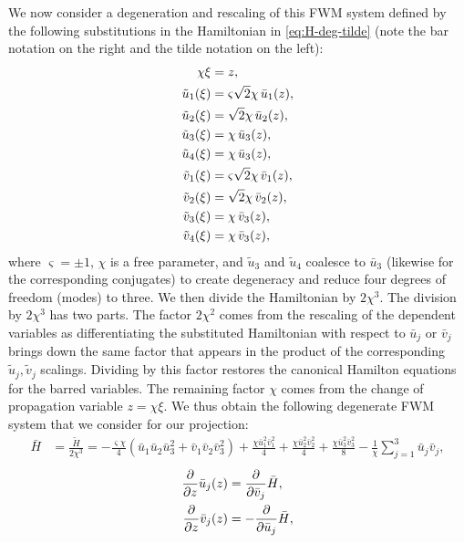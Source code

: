 \documentclass[11pt,a4paper]{article}
\numberwithin{equation}{section}
\begin{document}
We now consider a degeneration and rescaling of this FWM system defined by the following substitutions in the Hamiltonian in \eqref{eq:H-deg-tilde} (note the bar notation on the right and the tilde notation on the left):
\begin{align}
  \chi\xi &= z, \notag \\
  \tilde{u}_1(\xi) &= \varsigma \sqrt{2}\chi \,\bar{u}_1(z), \notag \\
  \tilde{u}_2(\xi) &= \sqrt{2} \chi  \,\bar{u}_2(z), \notag \\
  \tilde{u}_3(\xi) &= \chi  \,\bar{u}_3(z), \notag \\
  \tilde{u}_4(\xi) &= \chi  \,\bar{u}_3(z), \notag \\
  \tilde{v}_1(\xi) &= \varsigma \sqrt{2} \chi  \,\bar{v}_1(z), \notag \\
  \tilde{v}_2(\xi) &= \sqrt{2} \chi  \,\bar{v}_2(z), \notag \\
  \tilde{v}_3(\xi) &= \chi  \,\bar{v}_3(z), \notag \\
  \tilde{v}_4(\xi) &= \chi  \,\bar{v}_3(z), \notag \\
\end{align}
where $\varsigma = \pm 1$, $\chi$ is a free parameter, and $\tilde{u}_3$ and $\tilde{u}_4$ coalesce to $\bar{u}_3$ (likewise for the corresponding conjugates) to create degeneracy and reduce four degrees of freedom (modes) to three.
We then divide the Hamiltonian by $2 \chi^3$.
The division by $2\chi^3$ has two parts. The factor $2\chi^2$ comes from the rescaling of the dependent variables as differentiating the substituted Hamiltonian with respect to $\bar u_j$ or $\bar v_j$ brings down the same factor that appears in the product of the corresponding $\tilde u_j,\tilde v_j$ scalings. 
Dividing by this factor restores the canonical Hamilton equations for the barred variables. The remaining factor $\chi$ comes from the change of propagation variable $z=\chi\xi$.
We thus obtain the following degenerate FWM system that we consider for our projection:
\begin{align}
\bar{H} &= \frac{\tilde{H}}{2 \chi^{3}} = - \frac{\varsigma \chi }{4}\left( \bar{u}_1 \bar{u}_2 \bar{u}^{2}_3 + \bar{v}_1 \bar{v}_2 \bar{v}^{2}_3 \right) + \frac{\chi \bar{u}^{2}_1 \bar{v}^{2}_1}{4} + \frac{\chi \bar{u}^{2}_2 \bar{v}^{2}_2}{4} + \frac{\chi \bar{u}^{2}_3 \bar{v}^{2}_3}{8} - \frac{1}{\chi}\sum_{j=1}^{3}\bar{u}_j \bar{v}_j, \label{eq:Hbar-deg-fem}
\end{align}
\begin{align}
  \frac{\partial}{\partial z} \bar{u}_j(z) &=  \frac{\partial}{\partial \bar{v}_j} \bar{H}, \notag \\
  \frac{\partial}{\partial z} \bar{v}_j(z) &=  -\frac{\partial}{\partial \bar{u}_j} \bar{H}, \notag
\end{align}
\end{document}
